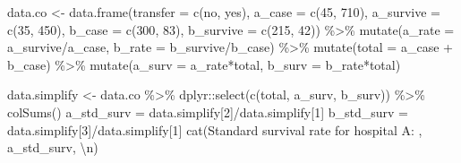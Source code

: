 \documentclass{article}
\newenvironment{Shaded}{\begin{snugshade}}{\end{snugshade}}
\newcommand{\AttributeTok}[1]{\textcolor[rgb]{0.77,0.63,0.00}{#1}}
\newcommand{\DecValTok}[1]{\textcolor[rgb]{0.00,0.00,0.81}{#1}}
\newcommand{\FunctionTok}[1]{\textcolor[rgb]{0.00,0.00,0.00}{#1}}
\newcommand{\NormalTok}[1]{#1}
\newcommand{\OtherTok}[1]{\textcolor[rgb]{0.56,0.35,0.01}{#1}}
\newcommand{\SpecialCharTok}[1]{\textcolor[rgb]{0.00,0.00,0.00}{#1}}
\newcommand{\StringTok}[1]{\textcolor[rgb]{0.31,0.60,0.02}{#1}}
\begin{document}
\begin{Shaded}
\begin{Highlighting}[]
\NormalTok{data.co }\OtherTok{\textless{}{-}} \FunctionTok{data.frame}\NormalTok{(}\AttributeTok{transfer =} \FunctionTok{c}\NormalTok{(}\StringTok{\textquotesingle{}no\textquotesingle{}}\NormalTok{, }\StringTok{\textquotesingle{}yes\textquotesingle{}}\NormalTok{), }\AttributeTok{a\_case =} \FunctionTok{c}\NormalTok{(}\DecValTok{45}\NormalTok{, }\DecValTok{710}\NormalTok{), }
                      \AttributeTok{a\_survive =} \FunctionTok{c}\NormalTok{(}\DecValTok{35}\NormalTok{, }\DecValTok{450}\NormalTok{), }\AttributeTok{b\_case =} \FunctionTok{c}\NormalTok{(}\DecValTok{300}\NormalTok{, }\DecValTok{83}\NormalTok{), }
                      \AttributeTok{b\_survive =} \FunctionTok{c}\NormalTok{(}\DecValTok{215}\NormalTok{, }\DecValTok{42}\NormalTok{)) }\SpecialCharTok{\%\textgreater{}\%}
    \FunctionTok{mutate}\NormalTok{(}\AttributeTok{a\_rate =}\NormalTok{ a\_survive}\SpecialCharTok{/}\NormalTok{a\_case, }\AttributeTok{b\_rate =}\NormalTok{ b\_survive}\SpecialCharTok{/}\NormalTok{b\_case) }\SpecialCharTok{\%\textgreater{}\%}
    \FunctionTok{mutate}\NormalTok{(}\AttributeTok{total =}\NormalTok{ a\_case }\SpecialCharTok{+}\NormalTok{ b\_case) }\SpecialCharTok{\%\textgreater{}\%}
    \FunctionTok{mutate}\NormalTok{(}\AttributeTok{a\_surv =}\NormalTok{ a\_rate}\SpecialCharTok{*}\NormalTok{total, }\AttributeTok{b\_surv =}\NormalTok{ b\_rate}\SpecialCharTok{*}\NormalTok{total)}

\NormalTok{data.simplify }\OtherTok{\textless{}{-}}\NormalTok{ data.co }\SpecialCharTok{\%\textgreater{}\%}\NormalTok{ dplyr}\SpecialCharTok{::}\FunctionTok{select}\NormalTok{(}\FunctionTok{c}\NormalTok{(}\StringTok{\textquotesingle{}total\textquotesingle{}}\NormalTok{, }\StringTok{\textquotesingle{}a\_surv\textquotesingle{}}\NormalTok{, }\StringTok{\textquotesingle{}b\_surv\textquotesingle{}}\NormalTok{)) }\SpecialCharTok{\%\textgreater{}\%}
    \FunctionTok{colSums}\NormalTok{()}
\NormalTok{a\_std\_surv }\OtherTok{=}\NormalTok{ data.simplify[}\DecValTok{2}\NormalTok{]}\SpecialCharTok{/}\NormalTok{data.simplify[}\DecValTok{1}\NormalTok{]}
\NormalTok{b\_std\_surv }\OtherTok{=}\NormalTok{ data.simplify[}\DecValTok{3}\NormalTok{]}\SpecialCharTok{/}\NormalTok{data.simplify[}\DecValTok{1}\NormalTok{]}
\FunctionTok{cat}\NormalTok{(}\StringTok{\textquotesingle{}Standard survival rate for hospital A: \textquotesingle{}}\NormalTok{, a\_std\_surv, }\StringTok{\textquotesingle{}}\SpecialCharTok{\textbackslash{}n}\StringTok{\textquotesingle{}}\NormalTok{)}
\end{Highlighting}
\end{Shaded}
\end{document}
